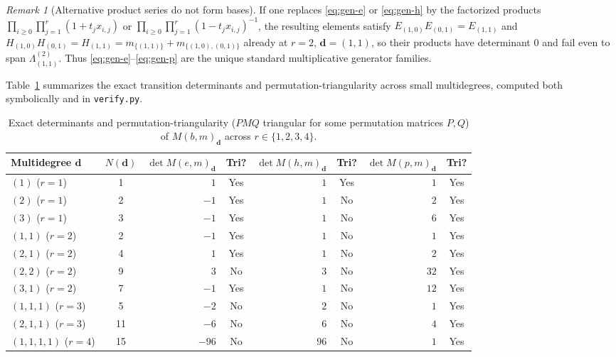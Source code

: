 \documentclass[11pt,a4paper]{article}
\theoremstyle{definition}
\theoremstyle{remark}
\newtheorem{remark}[theorem]{Remark}
\newcommand{\vecd}{\mathbf{d}}
\begin{document}
\begin{remark}[Alternative product series do not form bases]
If one replaces \eqref{eq:gen-e} or \eqref{eq:gen-h} by the factorized products $\prod_{i \ge 0} \prod_{j=1}^r (1 + t_j x_{i,j})$ or $\prod_{i \ge 0} \prod_{j=1}^r (1 - t_j x_{i,j})^{-1}$, the resulting elements satisfy $E_{(1,0)} E_{(0,1)} = E_{(1,1)}$ and $H_{(1,0)} H_{(0,1)} = H_{(1,1)} = m_{\{(1,1)\}} + m_{\{(1,0),(0,1)\}}$ already at $r = 2$, $\vecd = (1,1)$, so their products have determinant $0$ and fail even to span $\Lambda^{(2)}_{(1,1)}$. Thus \eqref{eq:gen-e}--\eqref{eq:gen-p} are the unique standard multiplicative generator families.
\end{remark}

Table~\ref{tab:summary} summarizes the exact transition determinants and permutation-triangularity across small multidegrees, computed both symbolically and in \texttt{verify.py}.

\begin{table}[ht]
\centering
\caption{Exact determinants and permutation-triangularity ($P M Q$ triangular for some permutation matrices $P, Q$) of $M(b,m)_{\vecd}$ across $r \in \{1,2,3,4\}$.}
\label{tab:summary}
\medskip
{\renewcommand{\arraystretch}{1.15}
\begin{tabular}{lcrcrcrc}
\hline
Multidegree $\vecd$ & $N(\vecd)$ & $\det M(e,m)_{\vecd}$ & Tri? & $\det M(h,m)_{\vecd}$ & Tri? & $\det M(p,m)_{\vecd}$ & Tri? \\
\hline
$(1)$ ($r=1$)         &  1 & $1$   & Yes & $1$  & Yes & $1$  & Yes \\
$(2)$ ($r=1$)         &  2 & $-1$  & Yes & $1$  & No  & $2$  & Yes \\
$(3)$ ($r=1$)         &  3 & $-1$  & Yes & $1$  & No  & $6$  & Yes \\
$(1,1)$ ($r=2$)       &  2 & $-1$  & Yes & $1$  & No  & $1$  & Yes \\
$(2,1)$ ($r=2$)       &  4 & $1$   & Yes & $1$  & No  & $2$  & Yes \\
$(2,2)$ ($r=2$)       &  9 & $3$   & No  & $3$  & No  & $32$ & Yes \\
$(3,1)$ ($r=2$)       &  7 & $-1$  & Yes & $1$  & No  & $12$ & Yes \\
$(1,1,1)$ ($r=3$)     &  5 & $-2$  & No  & $2$  & No  & $1$  & Yes \\
$(2,1,1)$ ($r=3$)     & 11 & $-6$  & No  & $6$  & No  & $4$  & Yes \\
$(1,1,1,1)$ ($r=4$)   & 15 & $-96$ & No  & $96$ & No  & $1$  & Yes \\
\hline
\end{tabular}}
\end{table}
\end{document}
